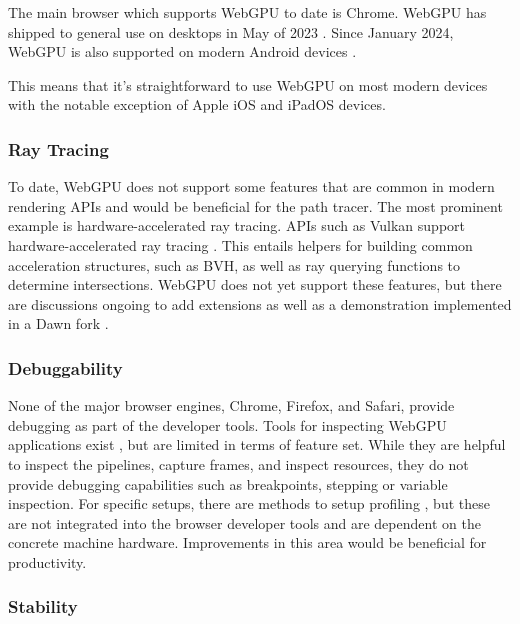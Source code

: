The main browser which supports \gls{WebGPU} to date is Chrome. \gls{WebGPU} has shipped to general use on desktops in May of 2023 \cite{ChromeWebGPUSupport}. Since January 2024, \gls{WebGPU} is also supported on modern Android devices \cite{ChromeAndroidWebGPUSupport}.

This means that it's straightforward to use \gls{WebGPU} on most modern devices with the notable exception of Apple iOS and iPadOS devices.

\subsubsection*{Ray Tracing}

To date, \gls{WebGPU} does not support some features that are common in modern rendering \glspl{API} and would be beneficial for the path tracer. The most prominent example is hardware-accelerated ray tracing. \glspl{API} such as Vulkan support hardware-accelerated ray tracing \cite{vulkanRayTracing}. This entails helpers for building common acceleration structures, such as \gls{BVH}, as well as ray querying functions to determine intersections. \gls{WebGPU} does not yet support these features, but there are discussions ongoing to add extensions \cite{webGPURayTracing} as well as a demonstration implemented in a Dawn fork \cite{webGPURayTracingFork}.

\subsubsection*{Debuggability}

None of the major browser engines, Chrome, Firefox, and Safari, provide debugging as part of the developer tools. Tools for inspecting \gls{WebGPU} applications exist \cite{webGpuDevToolsDuncan, webGpuDevToolsTakahiro}, but are limited in terms of feature set. While they are helpful to inspect the pipelines, capture frames, and inspect resources, they do not provide debugging capabilities such as breakpoints, stepping or variable inspection. For specific setups, there are methods to setup profiling \cite{webGpuProfilingWithPix}, but these are not integrated into the browser developer tools and are dependent on the concrete machine hardware. Improvements in this area would be beneficial for productivity.

\subsubsection*{Stability}

